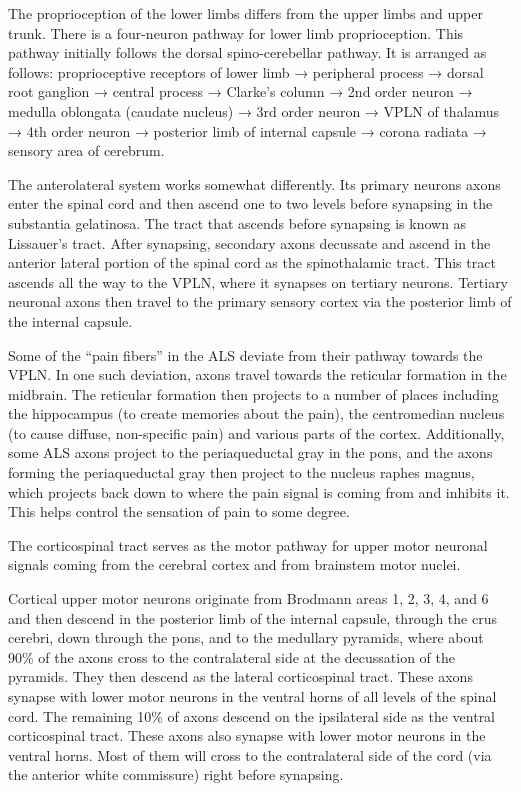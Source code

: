 \documentclass[]{book}
\begin{document}
The proprioception of the lower limbs differs from the upper limbs and upper trunk. There is a four-neuron pathway for lower limb proprioception. This pathway initially follows the dorsal spino-cerebellar pathway. It is arranged as follows: proprioceptive receptors of lower limb → peripheral process → dorsal root ganglion → central process → Clarke's column → 2nd order neuron → medulla oblongata (caudate nucleus) → 3rd order neuron → VPLN of thalamus → 4th order neuron → posterior limb of internal capsule → corona radiata → sensory area of cerebrum.

The anterolateral system works somewhat differently. Its primary neurons axons enter the spinal cord and then ascend one to two levels before synapsing in the substantia gelatinosa. The tract that ascends before synapsing is known as Lissauer's tract. After synapsing, secondary axons decussate and ascend in the anterior lateral portion of the spinal cord as the spinothalamic tract. This tract ascends all the way to the VPLN, where it synapses on tertiary neurons. Tertiary neuronal axons then travel to the primary sensory cortex via the posterior limb of the internal capsule.

Some of the ``pain fibers'' in the ALS deviate from their pathway towards the VPLN. In one such deviation, axons travel towards the reticular formation in the midbrain. The reticular formation then projects to a number of places including the hippocampus (to create memories about the pain), the centromedian nucleus (to cause diffuse, non-specific pain) and various parts of the cortex. Additionally, some ALS axons project to the periaqueductal gray in the pons, and the axons forming the periaqueductal gray then project to the nucleus raphes magnus, which projects back down to where the pain signal is coming from and inhibits it. This helps control the sensation of pain to some degree.

The corticospinal tract serves as the motor pathway for upper motor neuronal signals coming from the cerebral cortex and from brainstem motor nuclei.

Cortical upper motor neurons originate from Brodmann areas 1, 2, 3, 4, and 6 and then descend in the posterior limb of the internal capsule, through the crus cerebri, down through the pons, and to the medullary pyramids, where about 90\% of the axons cross to the contralateral side at the decussation of the pyramids. They then descend as the lateral corticospinal tract. These axons synapse with lower motor neurons in the ventral horns of all levels of the spinal cord. The remaining 10\% of axons descend on the ipsilateral side as the ventral corticospinal tract. These axons also synapse with lower motor neurons in the ventral horns. Most of them will cross to the contralateral side of the cord (via the anterior white commissure) right before synapsing.
\end{document}
